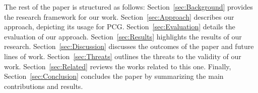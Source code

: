 The rest of the paper is structured as follows: Section~\ref{sec:Background} provides the research framework for our work. Section~\ref{sec:Approach} describes our approach, depicting its usage for PCG. Section~\ref{sec:Evaluation} details the evaluation of our approach. Section~\ref{sec:Results} highlights the results of our research. Section~\ref{sec:Discussion} discusses the outcomes of the paper and future lines of work. Section~\ref{sec:Threats} outlines the threats to the validity of our work. Section~\ref{sec:Related} reviews the works related to this one. Finally, Section~\ref{sec:Conclusion} concludes the paper by summarizing the main contributions and results.